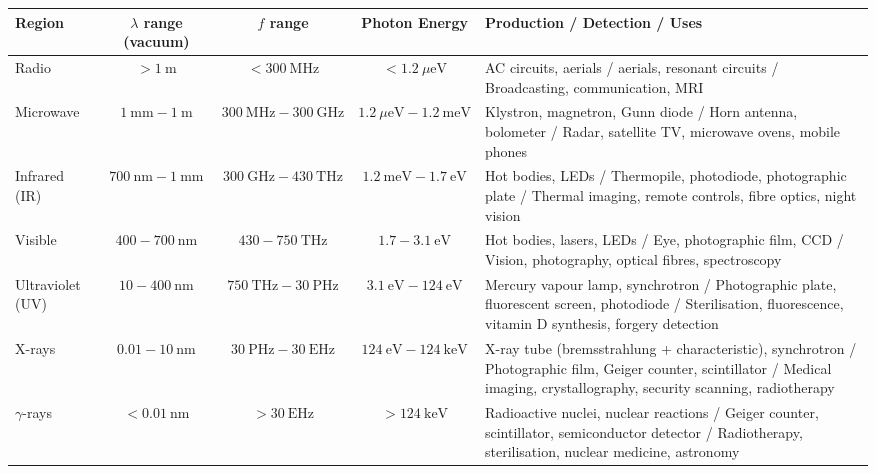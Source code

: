 \documentclass[11pt]{article}
\begin{document}
\begin{center}
\begin{tabularx}{\linewidth}{|l|c|c|c|X|}\hline
\rowcolor{popblueL}
\textbf{Region} & \textbf{$\lambda$ range (vacuum)} & \textbf{$f$ range} & \textbf{Photon Energy} & \textbf{Production / Detection / Uses} \\ \hline
Radio & $> 1\ \mathrm{m}$ & $< 300\ \mathrm{MHz}$ & $< 1.2\ \mu\mathrm{eV}$ & AC circuits, aerials / aerials, resonant circuits / Broadcasting, communication, MRI \\ \hline
Microwave & $1\ \mathrm{mm} - 1\ \mathrm{m}$ & $300\ \mathrm{MHz} - 300\ \mathrm{GHz}$ & $1.2\ \mu\mathrm{eV} - 1.2\ \mathrm{meV}$ & Klystron, magnetron, Gunn diode / Horn antenna, bolometer / Radar, satellite TV, microwave ovens, mobile phones \\ \hline
Infrared (IR) & $700\ \mathrm{nm} - 1\ \mathrm{mm}$ & $300\ \mathrm{GHz} - 430\ \mathrm{THz}$ & $1.2\ \mathrm{meV} - 1.7\ \mathrm{eV}$ & Hot bodies, LEDs / Thermopile, photodiode, photographic plate / Thermal imaging, remote controls, fibre optics, night vision \\ \hline
Visible & $400 - 700\ \mathrm{nm}$ & $430 - 750\ \mathrm{THz}$ & $1.7 - 3.1\ \mathrm{eV}$ & Hot bodies, lasers, LEDs / Eye, photographic film, CCD / Vision, photography, optical fibres, spectroscopy \\ \hline
Ultraviolet (UV) & $10 - 400\ \mathrm{nm}$ & $750\ \mathrm{THz} - 30\ \mathrm{PHz}$ & $3.1\ \mathrm{eV} - 124\ \mathrm{eV}$ & Mercury vapour lamp, synchrotron / Photographic plate, fluorescent screen, photodiode / Sterilisation, fluorescence, vitamin D synthesis, forgery detection \\ \hline
X-rays & $0.01 - 10\ \mathrm{nm}$ & $30\ \mathrm{PHz} - 30\ \mathrm{EHz}$ & $124\ \mathrm{eV} - 124\ \mathrm{keV}$ & X-ray tube (bremsstrahlung + characteristic), synchrotron / Photographic film, Geiger counter, scintillator / Medical imaging, crystallography, security scanning, radiotherapy \\ \hline
$\gamma$-rays & $< 0.01\ \mathrm{nm}$ & $> 30\ \mathrm{EHz}$ & $> 124\ \mathrm{keV}$ & Radioactive nuclei, nuclear reactions / Geiger counter, scintillator, semiconductor detector / Radiotherapy, sterilisation, nuclear medicine, astronomy \\ \hline
\end{tabularx}
\end{center}
\end{document}
